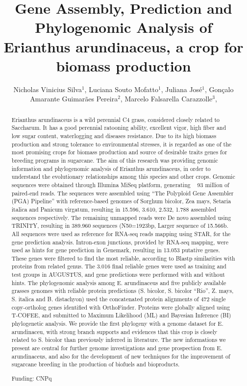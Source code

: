 \documentclass[twoside]{article}
\title{\vspace{-15mm}\fontsize{24pt}{10pt}\selectfont\textbf{ Gene Assembly, Prediction and Phylogenomic Analysis of Erianthus arundinaceus, a crop for biomass production }} %
\author{ Nicholas Vinicius Silva$^{1}$, Luciana Souto Mofatto$^{1}$, Juliana José$^{1}$, Gonçalo Amarante Guimarães Pereira$^{2}$, Marcelo Falsarella Carazzolle$^{3}$, }
\affil{ 1 UNICAMP

2 Brazilian Bioethanol Science and Technology Laboratory, Brazilian Center for Research in Energy and Materials, Biology Institute – UNICAMP

3 Biology Institute - UNICAMP, National Center for High Performance Computing

 }
\date{}
\begin{document}
  
  
  \maketitle %
  
  
  \thispagestyle{fancy} %
  
  
  \begin{abstract}
  Erianthus arundinaceus is a wild perennial C4 grass, considered closely related to Saccharum. It has a good perennial ratooning ability, excellent vigor, high fiber and low sugar content, waterlogging and diseases resistance. Due to its high biomass production and strong tolerance to environmental stresses, it is regarded as one of the most promising crops for biomass production and source of desirable traits genes for breeding programs in sugarcane. The aim of this research was providing genomic information and phylogenomic analysis of Erianthus arundinaceus, in order to understand the evolutionary relationships among this species and other crops. Genomic sequences were obtained through Illumina MiSeq platform, generating ~ 93 million of paired-end reads. The sequences were assembled using “The Polyploid Gene Assembler (PGA) Pipeline” with reference-based genomes of Sorghum bicolor, Zea mays, Setaria italica and Panicum virgatum, resulting in 15.596, 3.610, 2.532, 1.788 assembled sequences respectively. The remaining unmapped reads were De novo assembled using TRINITY, resulting in 389.960 sequences (N50=1923bp, Larger sequence of 15.566b. All sequences were used as reference for RNA-seq reads mapping using STAR, for the gene prediction analysis. Intron-exon junctions, provided by RNA-seq mapping, were used as hints for gene prediction in Genemark, resulting in 13.053 putative genes. These genes were filtered to find the most reliable, according to Blastp similarities with proteins from related genus. The 3.016 final reliable genes were used as training and test groups in AUGUSTUS, and gene predictions were performed with and without hints. The phylogenomic analysis among E. arundinaceus and five publicly available grasses genomes with reliable protein predictions (S. bicolor, S. bicolor “Rio”, Z. mays, S. italica and B. distachyon) used the concatenated protein alignments of 472 single copy-ortholog genes identified with OrthoFinder. Proteins were globally aligned using T-COFEE, and submitted to Maximum Likelihood (ML) and Bayesian Inference (BI) phylogenetic analysis. We provide the first phylogeny with a genome dataset for E. arundinaceu, with strong branch supports and evidences that this crop is closely related to S. bicolor than previously inferred in literature. The new informations we present are central for further genome investigations and gene prospection from E. arundinaceus, and also for the development of new techniques for the improvement of sugarcane breeding in the production of biofuels and bioproducts.
  
  Funding: CNPq \\ 
  \end{abstract}
  
\end{document}
